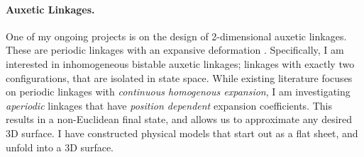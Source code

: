 \paragraph{Auxetic Linkages.}
One of my ongoing projects is on the design of 2-dimensional auxetic linkages.
These are periodic linkages with an expansive deformation \cite{aux0,aux1}.
Specifically, I am interested in inhomogeneous bistable auxetic linkages;
linkages with exactly two configurations, that are isolated in state space.
While existing literature focuses on periodic linkages with \emph{continuous homogenous expansion},
I am investigating \emph{aperiodic} linkages that have \emph{position dependent} expansion coefficients.
This results in a non-Euclidean final state, and allows us to approximate any desired 3D surface.
I have constructed physical models that start out as a flat sheet, and unfold into a 3D surface.
